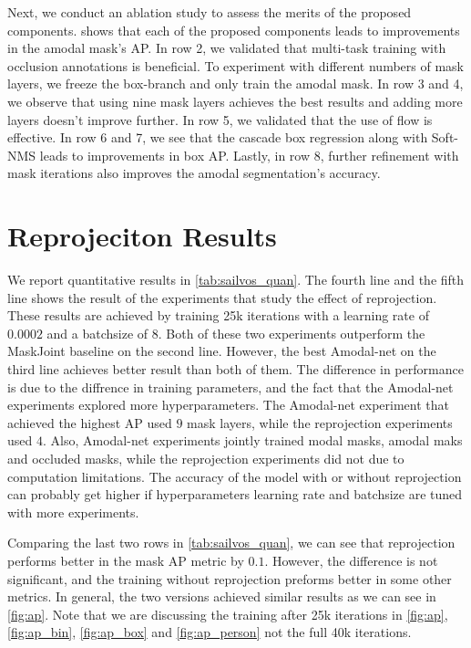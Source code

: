 Next, we conduct an ablation study to assess the merits of the proposed components.   shows that each of the proposed components leads to improvements in the amodal mask's AP.
In row 2, we validated that multi-task training with occlusion annotations is beneficial. 
To experiment with different numbers of mask layers, we freeze the box-branch and only train the amodal mask.
In row 3 and 4, we observe that using nine mask layers achieves the best results and adding more layers doesn't improve further. In row 5, we validated that the use of flow is effective. 
In row 6 and 7, we see that the cascade box regression along with Soft-NMS leads to improvements in box AP. Lastly, in row 8, further refinement with mask iterations also improves the amodal segmentation's accuracy.




\section{Reprojeciton Results}
We report quantitative results in \ref{tab:sailvos_quan}. The fourth line and the fifth line shows the result of the experiments that study the effect of reprojection. These results are achieved by training 25k iterations with a learning rate of $0.0002$ and a batchsize of $8$. Both of these two experiments outperform the MaskJoint baseline on the second line. However, the best Amodal-net on the third line achieves better result than both of them. The difference in performance is due to the diffrence in training parameters, and the fact that the Amodal-net experiments explored more hyperparameters. The Amodal-net experiment that achieved the highest AP used $9$ mask layers, while the reprojection experiments used $4$. Also, Amodal-net experiments jointly trained modal masks, amodal maks and occluded masks, while the reprojection experiments did not due to computation limitations. The accuracy of the model with or without reprojection can probably get higher if hyperparameters \eg learning rate and batchsize are tuned with more experiments. 

 

Comparing the last two rows in \ref{tab:sailvos_quan}, we can see that reprojection performs better in the mask AP metric by $0.1$. However, the difference is not significant, and the training without reprojection preforms better in some other metrics. In general, the two versions achieved similar results as we can see in \ref{fig:ap}. Note that we are discussing the training after 25k iterations in \ref{fig:ap}, \ref{fig:ap_bin}, \ref{fig:ap_box} and \ref{fig:ap_person} not the full 40k iterations. 

